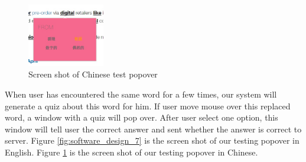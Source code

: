 \begin{figure}[ht]
    \centering
  \includegraphics[width=0.3\textwidth]{software_design_8.jpg}
  \caption{Screen shot of Chinese test popover}
  \label{fig:software_design_8}
\end{figure}
When user has encountered the same word for a few times, our system will generate a quiz about this word for him.  If user move mouse over this replaced word, a window with a quiz will pop over. After user select one option, this window will tell user the correct answer and sent whether the answer is correct to server. Figure \ref{fig:software_design_7} is the screen shot of our testing popover in English. Figure \ref{fig:software_design_8} is the screen shot of our testing popover in Chinese.
